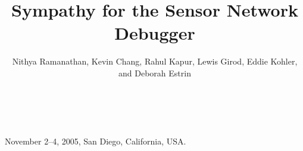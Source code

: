 \documentclass[10pt,twocolumn]{article}
\begin{document}
\title{\sffamily\textbf{Sympathy for the Sensor Network Debugger}}


\author{\sffamily Nithya Ramanathan, Kevin Chang, Rahul Kapur, Lewis Girod,
Eddie Kohler, and Deborah Estrin \\
\noalign{\vskip2pt}
 \\
\noalign{\vskip2pt}
 \\
\noalign{\vskip-.25in}
\null}
\date{}
\maketitle

\begin{comment}
\begin{center}
{\LARGE The KudOS File Server Architecture}\\
\vspace{0.08in}
{\large Andrew de los Reyes,$^*$ Chris Frost,$^{*+}$ Eddie Kohler,$^+$ Mike Mammarella,$^{*+}$ Lei Zhang$^*$ }\\
{\large \{adlr,frost,kohler,mikem,leiz\}@cs.ucla.edu }\\
($^*$: students, $^+$: attending conference)
\end{center}
\end{comment}

\normalsize
{} {November 2--4, 2005, San Diego, California, USA.}









\end{document}
